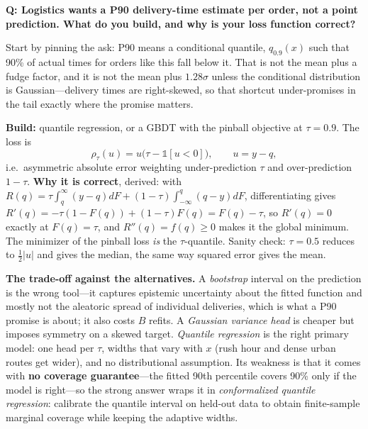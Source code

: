 \begin{interviewq}
\textbf{Q: Logistics wants a P90 delivery-time estimate per order, not a point prediction. What do you build, and why is your loss function correct?}

 \quad {} \quad \badgefreq{\freqlow}

\stronganswer

Start by pinning the ask: P90 means a conditional quantile, $q_{0.9}(x)$ such that 90\% of actual times for orders like this fall below it. That is not the mean plus a fudge factor, and it is not the mean plus $1.28\sigma$ unless the conditional distribution is Gaussian---delivery times are right-skewed, so that shortcut under-promises in the tail exactly where the promise matters.

\textbf{Build:} quantile regression, or a GBDT with the pinball objective at $\tau = 0.9$. The loss is
\begin{equation*}
\rho_\tau(u) = u\big(\tau - \mathds{1}[u<0]\big), \qquad u = y - q,
\end{equation*}
i.e.\ asymmetric absolute error weighting under-prediction $\tau$ and over-prediction $1-\tau$. \textbf{Why it is correct}, derived: with $R(q) = \tau\int_q^\infty (y-q)dF + (1-\tau)\int_{-\infty}^q (q-y)dF$, differentiating gives $R'(q) = -\tau(1-F(q)) + (1-\tau)F(q) = F(q) - \tau$, so $R'(q) = 0$ exactly at $F(q) = \tau$, and $R''(q) = f(q) \ge 0$ makes it the global minimum. The minimizer of the pinball loss \textit{is} the $\tau$-quantile. Sanity check: $\tau = 0.5$ reduces to $\tfrac{1}{2}|u|$ and gives the median, the same way squared error gives the mean.

\textbf{The trade-off against the alternatives.} A \textit{bootstrap} interval on the prediction is the wrong tool---it captures epistemic uncertainty about the fitted function and mostly not the aleatoric spread of individual deliveries, which is what a P90 promise is about; it also costs $B$ refits. A \textit{Gaussian variance head} is cheaper but imposes symmetry on a skewed target. \textit{Quantile regression} is the right primary model: one head per $\tau$, widths that vary with $x$ (rush hour and dense urban routes get wider), and no distributional assumption. Its weakness is that it comes with \textbf{no coverage guarantee}---the fitted 90th percentile covers 90\% only if the model is right---so the strong answer wraps it in \textit{conformalized quantile regression}: calibrate the quantile interval on held-out data to obtain finite-sample marginal coverage while keeping the adaptive widths.


\end{interviewq}
